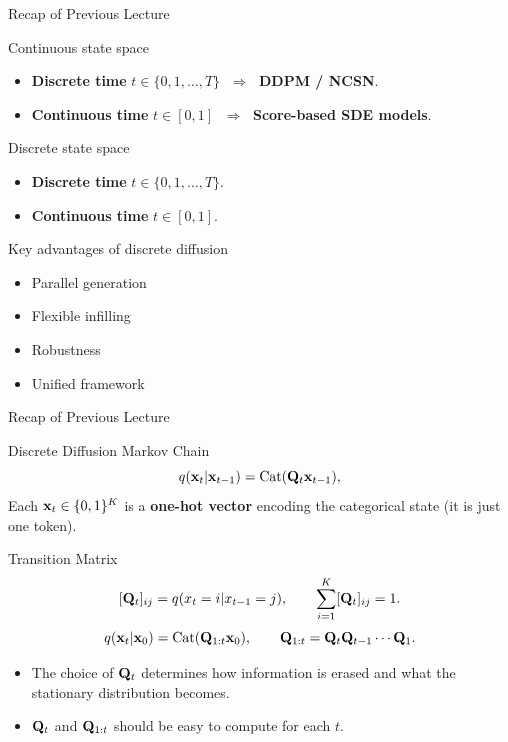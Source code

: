 \documentclass{beamer}
\begin{document}
\begin{frame}{Recap of Previous Lecture}
	\begin{block}{Continuous state space}
		\begin{itemize}
			\item \textbf{Discrete time} $t \in \{0,1,\ldots,T\}$ $\;\Rightarrow\;$ \textbf{DDPM / NCSN}.
			\item \textbf{Continuous time} $t \in [0,1]$ $\;\Rightarrow\;$ \textbf{Score-based SDE models}.
		\end{itemize}
	\end{block}
	\begin{block}{Discrete state space}
		\begin{itemize}
			\item \textbf{Discrete time} $t \in \{0,1,\ldots,T\}$.
			\item \textbf{Continuous time} $t \in [0,1]$.
		\end{itemize}
	\end{block}
    \begin{block}{Key advantages of discrete diffusion}
		\begin{itemize}
			\item Parallel generation
			\item Flexible infilling
			\item Robustness
			\item Unified framework
        \end{itemize}
	\end{block}
\end{frame}
\begin{frame}{Recap of Previous Lecture}
	\begin{block}{Discrete Diffusion Markov Chain}
		\[
			q(\mathbf{x}_t|\mathbf{x}_{t-1}) = \operatorname{Cat}(\mathbf{Q}_t\mathbf{x}_{t-1}),
		\]
        Each $\mathbf{x}_t \in \{0,1\}^K$ is a \textbf{one-hot vector} encoding the categorical state (it is just one token).
	\end{block}
    \begin{block}{Transition Matrix}
		\vspace{-0.5cm}
		\[
			[\mathbf{Q}_t]_{ij} = q(x_t = i | x_{t-1} = j),
			\qquad
			\sum_{i=1}^K [\mathbf{Q}_t]_{ij} = 1.
		\]
        \[
            q(\mathbf{x}_t|\mathbf{x}_0) = \operatorname{Cat}(\mathbf{Q}_{1:t}\mathbf{x}_0),
            \qquad
            \mathbf{Q}_{1:t} = \mathbf{Q}_t \mathbf{Q}_{t-1}\cdots\mathbf{Q}_1.
        \]
		\vspace{-0.5cm}
	\end{block}
    \begin{itemize}
		\item The choice of $\mathbf{Q}_t$ determines how information is erased and what the stationary distribution becomes.
		\item $\mathbf{Q}_t$ and $\mathbf{Q}_{1:t}$ should be easy to compute for each $t$.
	\end{itemize}
\end{frame}
\end{document}
